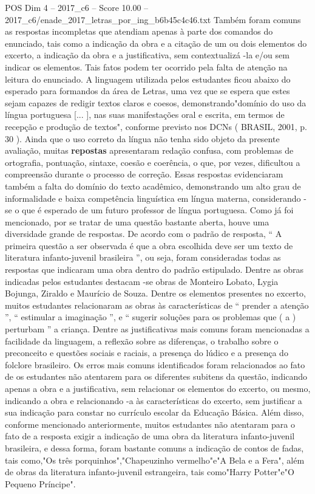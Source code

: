 \begin{textsample}{POS Dim 4 – 2017\_c6 – Score 10.00 – 2017\_c6/enade\_2017\_letras\_por\_ing\_b6b45c4c46.txt}
Também foram comuns as respostas incompletas que atendiam apenas à parte dos comandos do enunciado, tais como a indicação da obra e a citação de um ou dois elementos do excerto, a indicação da obra e a justificativa, sem contextualizá -la e/ou sem indicar os elementos.
Tais fatos podem ter ocorrido pela falta de atenção na leitura do enunciado.
A linguagem utilizada pelos estudantes ficou abaixo do esperado para formandos da área de Letras, uma vez que se espera que estes sejam capazes de redigir textos claros e coesos, demonstrando"domínio do uso da língua portuguesa [... ], nas suas manifestações oral e escrita, em termos de recepção e produção de textos", conforme previsto nos DCNs ( BRASIL, 2001, p. 30 ).
Ainda que o uso correto da língua não tenha sido objeto da presente avaliação, muitas \textbf{repostas} apresentaram redação confusa, com problemas de ortografia, pontuação, sintaxe, coesão e coerência, o que, por vezes, dificultou a compreensão durante o processo de correção.
Essas respostas evidenciaram também a falta do domínio do texto acadêmico, demonstrando um alto grau de informalidade e baixa competência linguística em língua materna, considerando -se o que é esperado de um futuro professor de língua portuguesa.
Como já foi mencionado, por se tratar de uma questão bastante aberta, houve uma diversidade grande de respostas.
De acordo com o padrão de resposta, “ A primeira questão a ser observada é que a obra escolhida deve ser um texto de literatura infanto-juvenil brasileira ”, ou seja, foram consideradas todas as respostas que indicaram uma obra dentro do padrão estipulado.
Dentre as obras indicadas pelos estudantes destacam -se obras de Monteiro Lobato, Lygia Bojunga, Ziraldo e Maurício de Souza.
Dentre os elementos presentes no excerto, muitos estudantes relacionaram as obras às características de “ prender a atenção ”, “ estimular a imaginação ”, e “ sugerir soluções para os problemas que ( a ) perturbam ” a criança.
Dentre as justificativas mais comuns foram mencionadas a facilidade da linguagem, a reflexão sobre as diferenças, o trabalho sobre o preconceito e questões sociais e raciais, a presença do lúdico e a presença do folclore brasileiro.
Os erros mais comuns identificados foram relacionados ao fato de os estudantes não atentarem para os diferentes subitens da questão, indicando apenas a obra e a justificativa, sem relacionar os elementos do excerto, ou mesmo, indicando a obra e relacionando -a às características do excerto, sem justificar a sua indicação para constar no currículo escolar da Educação Básica.
Além disso, conforme mencionado anteriormente, muitos estudantes não atentaram para o fato de a resposta exigir a indicação de uma obra da literatura infanto-juvenil brasileira, e dessa forma, foram bastante comuns a indicação de contos de fadas, tais como,"Os três porquinhos","Chapeuzinho vermelho"e"A Bela e a Fera", além de obras da literatura infanto-juvenil estrangeira, tais como"Harry Potter"e"O Pequeno Príncipe".

\end{textsample}

